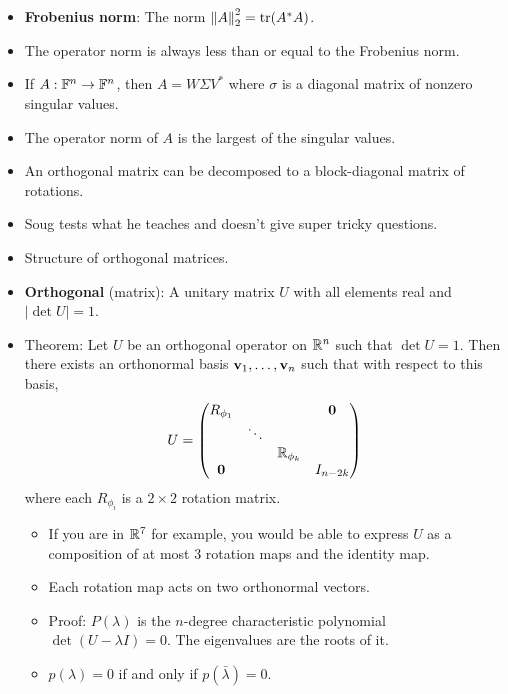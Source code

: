 \documentclass[../../notes.tex]{subfiles}
\begin{document}
\begin{itemize}
\begin{itemize}
    \end{itemize}
    \item \textbf{Frobenius norm}: The norm $\norm{A}_2^2=\trace(A^*A)$.
    \item The operator norm is always less than or equal to the Frobenius norm.
    \item If $A:\mathbb{F}^n\to\mathbb{F}^n$, then $A=W\Sigma V^*$ where $\sigma$ is a diagonal matrix of nonzero singular values.
    \item The operator norm of $A$ is the largest of the singular values.
    \item An orthogonal matrix can be decomposed to a block-diagonal matrix of rotations.
    \item {}Soug tests what he teaches and doesn't give super tricky questions.
    \item Structure of orthogonal matrices.
    \item \textbf{Orthogonal} (matrix): A unitary matrix $U$ with all elements real and $|\det U|=1$.
    \item Theorem: Let $U$ be an orthogonal operator on $\mathbb{R}^n$ such that $\det U=1$. Then there exists an orthonormal basis $\mathbf{v}_1,\dots,\mathbf{v}_n$ such that with respect to this basis,
    \begin{equation*}
        U =
        \begin{pmatrix}
            R_{\phi_1} &  &  & \bm{0}\\
             & \ddots &  & \\
             &  & \mathbb{R}_{\phi_k} & \\
            \bm{0} &  &  & I_{n-2k}\\
        \end{pmatrix}
    \end{equation*}
    where each $R_{\phi_i}$ is a $2\times 2$ rotation matrix.
    \begin{itemize}
        \item If you are in $\mathbb{R}^7$ for example, you would be able to express $U$ as a composition of at most 3 rotation maps and the identity map.
        \item Each rotation map acts on two orthonormal vectors.
        \item Proof: $P(\lambda)$ is the $n$-degree characteristic polynomial $\det(U-\lambda I)=0$. The eigenvalues are the roots of it.
        \item $p(\lambda)=0$ if and only if $p(\bar{\lambda})=0$.
        \begin{itemize}

\end{itemize}
\end{itemize}
\end{itemize}
\end{document}

